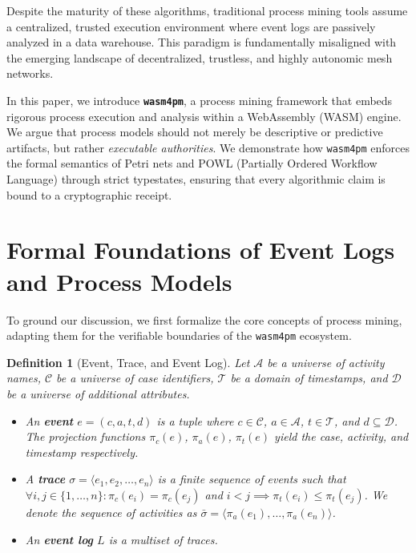 \documentclass[11pt,a4paper]{article}
\newtheorem{definition}{Definition}
\begin{document}
Despite the maturity of these algorithms, traditional process mining tools assume a centralized, trusted execution environment where event logs are passively analyzed in a data warehouse. This paradigm is fundamentally misaligned with the emerging landscape of decentralized, trustless, and highly autonomic mesh networks.

In this paper, we introduce \textbf{\texttt{wasm4pm}}, a process mining framework that embeds rigorous process execution and analysis within a WebAssembly (WASM) engine. We argue that process models should not merely be descriptive or predictive artifacts, but rather \textit{executable authorities}. We demonstrate how \texttt{wasm4pm} enforces the formal semantics of Petri nets and POWL (Partially Ordered Workflow Language) through strict typestates, ensuring that every algorithmic claim is bound to a cryptographic receipt.

\section{Formal Foundations of Event Logs and Process Models}

To ground our discussion, we first formalize the core concepts of process mining, adapting them for the verifiable boundaries of the \texttt{wasm4pm} ecosystem.

\begin{definition}[Event, Trace, and Event Log]
Let $\mathcal{A}$ be a universe of activity names, $\mathcal{C}$ be a universe of case identifiers, $\mathcal{T}$ be a domain of timestamps, and $\mathcal{D}$ be a universe of additional attributes.
\begin{itemize}
    \item An \textbf{event} $e = (c, a, t, d)$ is a tuple where $c \in \mathcal{C}$, $a \in \mathcal{A}$, $t \in \mathcal{T}$, and $d \subseteq \mathcal{D}$. The projection functions $\pi_c(e)$, $\pi_a(e)$, $\pi_t(e)$ yield the case, activity, and timestamp respectively.
    \item A \textbf{trace} $\sigma = \langle e_1, e_2, \dots, e_n \rangle$ is a finite sequence of events such that $\forall i, j \in \{1, \dots, n\}: \pi_c(e_i) = \pi_c(e_j)$ and $i < j \implies \pi_t(e_i) \le \pi_t(e_j)$. We denote the sequence of activities as $\bar{\sigma} = \langle \pi_a(e_1), \dots, \pi_a(e_n) \rangle$.
    \item An \textbf{event log} $L$ is a multiset of traces. 
\end{itemize}
\end{definition}
\end{document}
